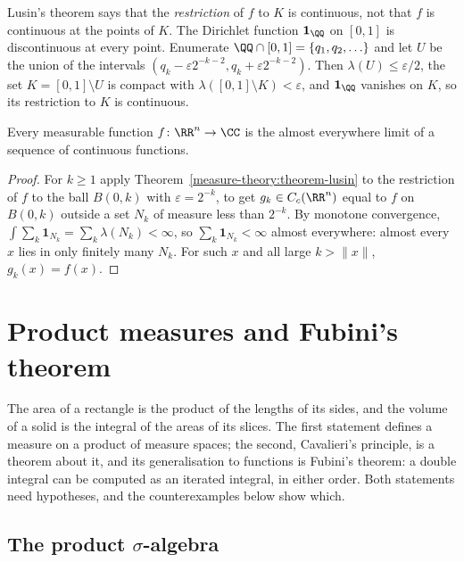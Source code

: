 \begin{example}\label{measure-theory:example-lusin-dirichlet}
Lusin's theorem says that the \emph{restriction} of $f$ to $K$ is continuous, not that $f$ is continuous at the points of $K$. The Dirichlet function
$\mathbf{1}_\QQ$ on $[0, 1]$ is discontinuous at every point. Enumerate $\QQ \cap [0, 1] = \{q_1, q_2, \ldots\}$ and let $U$ be the union of the intervals
$(q_k - \varepsilon2^{-k-2}, q_k + \varepsilon2^{-k-2})$. Then $\lambda(U) \leq \varepsilon/2$, the set $K = [0, 1] \setminus U$ is compact with
$\lambda([0, 1] \setminus K) < \varepsilon$, and $\mathbf{1}_\QQ$ vanishes on $K$, so its restriction to $K$ is continuous.
\end{example}

\begin{corollary}\label{measure-theory:corollary-lusin-limit}
Every measurable function $f \colon \RR^n \to \CC$ is the almost everywhere limit of a sequence of continuous functions.
\end{corollary}

\begin{proof}
For $k \geq 1$ apply Theorem~\ref{measure-theory:theorem-lusin} to the restriction of $f$ to the ball $B(0, k)$ with $\varepsilon = 2^{-k}$, to get
$g_k \in C_c(\RR^n)$ equal to $f$ on $B(0, k)$ outside a set $N_k$ of measure less than $2^{-k}$. By monotone convergence,
$\int\sum_k\mathbf{1}_{N_k} = \sum_k\lambda(N_k) < \infty$, so $\sum_k\mathbf{1}_{N_k} < \infty$ almost everywhere: almost every $x$ lies in only finitely many $N_k$.
For such $x$ and all large $k > \|x\|$, $g_k(x) = f(x)$.
\end{proof}

\section{Product measures and Fubini's theorem}\label{measure-theory:section-fubini}

The area of a rectangle is the product of the lengths of its sides, and the volume of a solid is the integral of the areas of its slices. The first statement defines a measure on a product of
measure spaces; the second, Cavalieri's principle, is a theorem about it, and its generalisation to functions is Fubini's theorem: a double integral can be computed as an iterated integral, in
either order. Both statements need hypotheses, and the counterexamples below show which.

\subsection{The product $\sigma$-algebra}\label{measure-theory:subsection-product-sigma-algebra}

